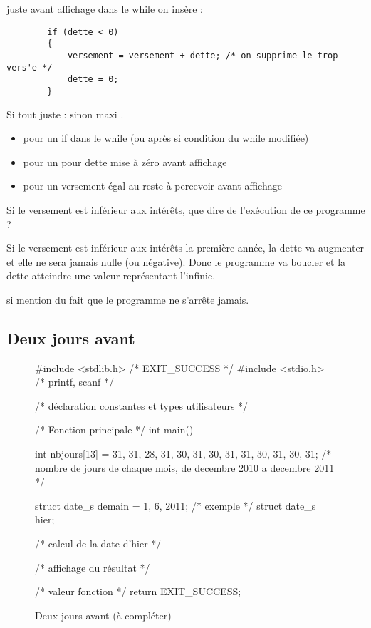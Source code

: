 \begin{correction}
juste avant affichage dans le while on insère :
  \begin{small}
\begin{verbatim}
        if (dette < 0)
        {
            versement = versement + dette; /* on supprime le trop vers'e */
            dette = 0;
        }
\end{verbatim}
  \end{small}
  
  \begin{baremeenv}
Si tout juste :  sinon maxi .
    \begin{itemize}
\item {} pour un if dans le while (ou après si condition du while
  modifiée)
\item {} pour un pour dette mise à zéro avant affichage
\item {} pour un versement égal au reste à percevoir avant affichage
\end{itemize}
  \end{baremeenv}
\end{correction}


\question Si le versement est inférieur aux intérêts, que dire de
l'exécution de ce programme ?

\begin{correction}
  Si le versement est inférieur aux intérêts la première année, la
  dette va augmenter et elle ne sera jamais nulle (ou négative). Donc
  le programme va boucler et la dette atteindre une valeur
  représentant l'infinie.

  \begin{baremeenv}
     si mention du fait que le programme ne s'arrête jamais.
  \end{baremeenv}
\end{correction}

\subsection{Deux jours avant}
\begin{figure}
\small
\begin{listing}{1}
#include <stdlib.h> /* EXIT_SUCCESS */
#include <stdio.h> /* printf, scanf */

/* déclaration constantes et types utilisateurs */

/* Fonction principale */
int main()
{
  int nbjours[13] = {31, 31, 28, 31, 30, 31, 30, 31, 31, 30, 31, 30, 31};
  /* nombre de jours de chaque mois, de decembre 2010 a decembre 2011 */
    
  struct date_s demain = {1, 6, 2011}; /* exemple */
  struct date_s hier;

  /* calcul de la date d'hier */
   
  /* affichage du résultat */

  /* valeur fonction */
  return EXIT_SUCCESS;
}
\end{listing}
  \caption{Deux jours avant (à compléter)}
  \label{fig:deuxj}
\end{figure}

